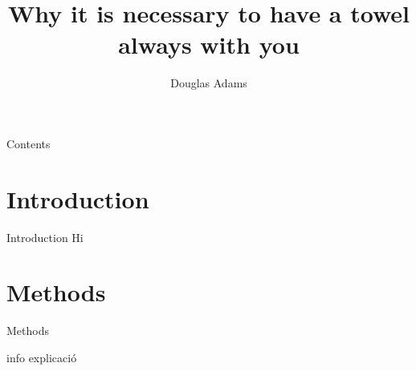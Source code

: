 \documentclass[mathserif, aspectratio=169]{beamer}
\title[Why it is necessary to have a towel always with you]{Why it is necessary to have a towel always with you}
\author[Douglas Adams]{{\LARGE Douglas Adams}}
\institute[]{{\normalsize\begin{tabular}{rl}
    Supervisor: & \textbf{BBC}
\end{tabular}}}
\date{{\small \displaydate{presentationdate}}}
\begin{document}
\begin{frame}[plain]
  \titlepage
\end{frame}

\begin{frame}{Contents}
  \tableofcontents
\end{frame}

\section{Introduction}
\begin{frame}{Introduction}
    Hi
\end{frame}

\section{Methods}
\begin{frame}{Methods}
    \begin{block}{info}
        explicació
    \end{block}
\end{frame}
\end{document}
